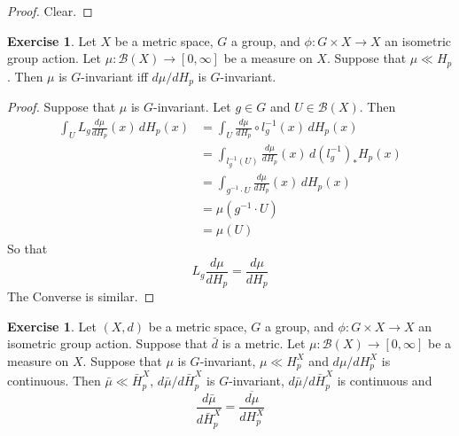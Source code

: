 \documentclass[12pt]{amsart}
\theoremstyle{definition}
\newtheorem{ex}[definition]{Exercise}
\newcommand{\MB}{\mathcal{B}}
\begin{document}
	\begin{proof}
	Clear.
	\end{proof}
	
	\begin{ex}
	Let $X$ be a metric space, $G$ a group, and $\phi: G \times X \rightarrow X$ an isometric group action. Let $\mu: \MB(X) \rightarrow [0, \infty]$ be a measure on $X$. Suppose that $\mu \ll H_p$. Then $\mu$ is $G$-invariant iff $d\mu /d H_p$ is $G$-invariant.
	\end{ex}	
	
	\begin{proof}
	Suppose that $\mu$ is $G$-invariant. Let $g \in G$ and $U \in \MB(X)$. Then 
	\begin{align*}
	\int_U L_g \frac{d\mu}{d H_p}(x) \, d  H_p (x)
	&= \int_U \frac{d\mu}{d H_p} \circ l_{g}^{-1}(x) \, d  H_p(x) \\
	&= \int_{l_{g}^{-1}( U) } \frac{d\mu}{d H_p}(x) \, d (l_{g}^{-1})_*H_p(x) \\
	&= \int_{g^{-1} \cdot U } \frac{d\mu}{d H_p}(x) \, d H_p(x) \\
	&= \mu(g^{-1} \cdot U) \\
	&= \mu (U)
	\end{align*}
	So that \begin{equation*}
	L_g \frac{d\mu}{d H_p} = \frac{d\mu}{d H_p}
	\end{equation*}
	The Converse is similar.
	\end{proof}
	
	\begin{ex}
	Let $(X, d)$ be a metric space, $G$ a group, and $\phi: G \times X \rightarrow X$ an isometric group action. Suppose that $\bar{d}$ is a metric. Let $\mu: \MB(X) \rightarrow [0, \infty]$ be a measure on $X$. Suppose that $\mu$ is $G$-invariant, $\mu \ll H_p^X$ and $d\mu / dH_p^X$ is continuous. Then $\bar{\mu} \ll \bar{H}_p^X$, $d\bar{\mu}/d \bar{H}_p^X$ is $G$-invariant, $d\bar{\mu}/d \bar{H}_p^X$ is continuous and 
	\begin{equation*}
	\frac{d \bar{\mu}}{d \bar{H}_p^X} = \overline{\frac{d \mu}{d H_p^X}}
	\end{equation*}
	\end{ex}
	
\end{document}
